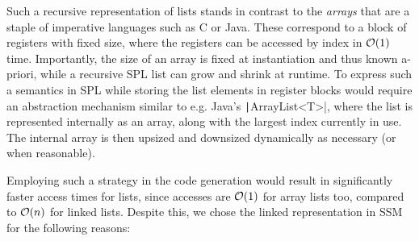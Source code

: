 Such a recursive representation of lists stands in contrast to the \emph{arrays}
that are a staple of imperative languages such as C or Java. These correspond
to a block of registers with fixed size, where the registers can be
accessed by index in $\mathcal{O}(1)$ time.
Importantly, the size of an array is fixed at instantiation and thus known
a-priori, while a recursive SPL list can grow and shrink at runtime. To express
such a semantics in SPL while storing the list elements in register blocks would
require an abstraction mechanism similar to e.g. Java's
\texttt|ArrayList<T>|, where the list is represented internally as an
array, along with the largest index currently in use. The internal array is then
upsized and downsized dynamically as necessary (or when reasonable).

Employing such a strategy in the code generation would result in significantly
faster access times for lists, since accesses are $\mathcal{O}(1)$ for array lists
too, compared to $\mathcal{O}(n)$ for linked lists.
Despite this, we chose the linked representation in SSM for the following reasons:
%
